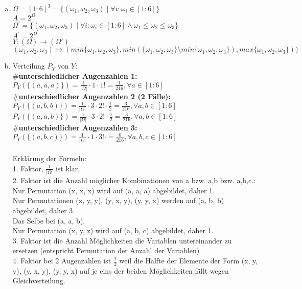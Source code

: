 \documentclass[10pt,a4paper]{article}
\begin{document}
\begin{enumerate}[a)]
 \item 
$\Omega = [1:6]^3 = \{(\omega_1, \omega_2, \omega_3) \mid \forall i: \omega_i \in [1:6]\}$\\
$A = 2 ^ \Omega$\\
$\Omega^\prime = \{(\omega_1, \omega_2, \omega_3) \mid \forall i: \omega_i \in [1:6] \land \omega_1 \leq \omega_2 \leq \omega_3 \}$\\
$A^\prime  = 2 ^ {\Omega^\prime} $\\

$Y:(\Omega) \rightarrow (\Omega')$\\
$(\omega_1, \omega_2, \omega_3) \mapsto (min\{\omega_1, \omega_2, \omega_3 \},
min(\{\omega_1, \omega_2, \omega_3\} \setminus min\{\omega_1, \omega_2, \omega_3\}), max\{\omega_1, \omega_2, \omega_3\})

)$
\item

Verteilung $P_Y$ von $Y$:\\
\textbf{$\#$unterschiedlicher Augenzahlen 1:}\\
$P_Y(\{(a,a,a)\}) = \frac{1}{|\Omega|} \cdot 1 \cdot 1! = \frac{1}{216}, \forall a \in [1:6]$\\
\textbf{$\#$unterschiedlicher Augenzahlen 2 (2 Fälle):}\\
$P_Y(\{(a,b,b)\}) = \frac{1}{|\Omega|} \cdot 3 \cdot 2! \cdot \frac{1}{2} = \frac{3}{216}, \forall a,b \in [1:6]$\\
$P_Y(\{(a,a,b)\}) = \frac{1}{|\Omega|} \cdot 3 \cdot 2! \cdot \frac{1}{2} = \frac{3}{216}, \forall a,b \in [1:6]$\\
\textbf{$\#$unterschiedlicher Augenzahlen 3:}\\
$P_Y(\{(a,b,c)\}) = \frac{1}{|\Omega|} \cdot 1 \cdot 3! \cdot = \frac{6}{216}, \forall a,b,c \in [1:6]$\\
\\

Erklärung der Formeln:\\
1. Faktor, $\frac{1}{|\Omega|}$ ist klar,\\
2. Faktor ist die Anzahl  möglicher Kombinationen von a bzw. a,b bzw. a,b,c.:\\
 Nur Permutation (x, x, x) wird auf (a, a, a) abgebildet, daher 1.\\
 Nur Permutationen (x, y, y), (y, x, y), (y, y, x) werden auf (a, b, b) abgebildet, daher 3.\\
 Das Selbe bei (a, a, b).\\
 Nur Permutation (x, y, z) wird auf (a, b, c) abgebildet, daher 1.\\
3. Faktor ist die Anzahl Möglichkeiten die Variablen untereinander zu ersetzen (entspricht Permutation der Anzahl der Variablen)\\
4. Faktor bei 2 Augenzahlen ist $\frac{1}{2}$ weil die Hälfte der Elemente der Form (x, y, y), (y, x, y), (y, y, x) auf je eins der beiden Möglichkeiten fällt wegen Gleichverteilung.\\
 


\end{enumerate}
\end{document}
